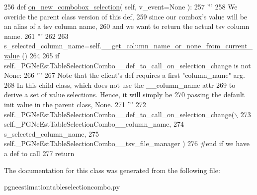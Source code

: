\begin{DoxyCode}
256     \textcolor{keyword}{def }\hyperlink{classnegui_1_1pgneestimationtableselectioncombo_1_1PGNeEstTableColumnSelectionCombo_a595df4d9b866e930a31b4b6f9caddba6}{on\_new\_combobox\_selection}( self, v\_event=None ):
257         \textcolor{stringliteral}{'''}
258 \textcolor{stringliteral}{        We overide the parent class version of this def,}
259 \textcolor{stringliteral}{        since our combox's value will be an alias of a tsv column name,}
260 \textcolor{stringliteral}{        and we want to return the actual tsv column name.}
261 \textcolor{stringliteral}{        '''}
262     
263         s\_selected\_column\_name=self.\hyperlink{classnegui_1_1pgneestimationtableselectioncombo_1_1PGNeEstTableColumnSelectionCombo_a5a22cad6c5b6740b40439d2e56068950}{\_\_get\_column\_name\_or\_none\_from\_current\_value}
      ()
264 
265         \textcolor{keywordflow}{if} self.\_PGNeEstTableSelectionCombo\_\_def\_to\_call\_on\_selection\_change \textcolor{keywordflow}{is} \textcolor{keywordflow}{not} \textcolor{keywordtype}{None}:
266             \textcolor{stringliteral}{'''}
267 \textcolor{stringliteral}{            Note that the client's def requires a first "column\_name" arg.}
268 \textcolor{stringliteral}{            In this child class, which does not use the \_\_column\_name attr}
269 \textcolor{stringliteral}{            to derive a set of value selections.  Hence, it will simply be }
270 \textcolor{stringliteral}{            passing the default init value in the parent class, None.}
271 \textcolor{stringliteral}{            '''}
272             self.\_PGNeEstTableSelectionCombo\_\_def\_to\_call\_on\_selection\_change(\(\backslash\)
273                                             self.\_PGNeEstTableSelectionCombo\_\_column\_name, 
274                                             s\_selected\_column\_name, 
275                                             self.\_PGNeEstTableSelectionCombo\_\_tsv\_file\_manager )
276         \textcolor{comment}{#end if we have a def to call}
277         \textcolor{keywordflow}{return}
\end{DoxyCode}


The documentation for this class was generated from the following file\+:\begin{DoxyCompactItemize}
\item 
pgneestimationtableselectioncombo.\+py\end{DoxyCompactItemize}
